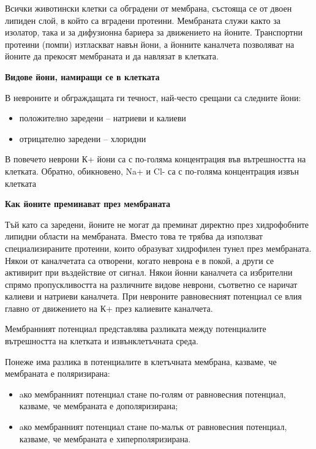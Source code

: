 \documentclass{article}
\begin{document}
Всички животински клетки са обградени от мембрана, състояща се от двоен липиден слой, в който са вградени протеини. Мембраната служи както за изолатор, така и за дифузионна бариера за движението на йоните. Транспортни протеини (помпи) изтласкват навън йони, а йонните каналчета позволяват на йоните да прекосят мембраната и да навлязат в клетката.

\vspace{5mm} %
\textbf{Видове йони, намиращи се в клетката}

В невроните и обграждащата ги течност, най-често срещани са следните йони:
\begin{itemize}
  \item положително заредени -- натриеви и калиеви
  \item отрицателно заредени -- хлоридни
\end{itemize}

В повечето неврони К+ йони са с по-голяма концентрация във вътрешността на клетката. Обратно, обикновено, Na+ и Cl- са с по-голяма концентрация извън клетката

\vspace{5mm}
\textbf{Как йоните преминават през мембраната}

Тъй като са заредени, йоните не могат да преминат директно през хидрофобните липидни области на мембраната. Вместо това те трябва да използват специализираните протеини, които образуват хидрофилен тунел през мембраната. Някои от каналчетата са отворени, когато неврона е в покой, а други се активирит при въздействие от сигнал. Някои йонни каналчета са избрителни спрямо пропускливостта на различните видове неврони, съответно се наричат калиеви и натриеви каналчета. При невроните равновесният потенциал се влия главно от движението на К+ през калиевите каналчета.

\vspace{5mm} %

Мембранният потенциал представлява разликата между потенциалите вътрешността на клетката и извънклетъчната среда.

Понеже има разлика в потенциалите в клетъчната мембрана, казваме, че мембраната е поляризирана:
\begin{itemize}
  \item aко мембранният потенциал стане по-голям от равновесния потенциал, казваме, че мембраната е дополяризирана;
  \item aко мембранният потенциал стане по-малък от равновесния потенциал, казваме, че мембраната е хиперполяризирана.
\end{itemize}
\end{document}

